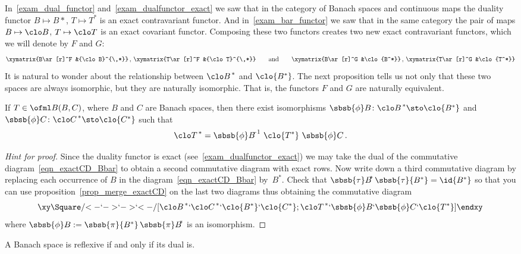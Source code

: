 In~\ref{exam_dual_functor} and~\ref{exam_dualfunctor_exact} we saw that in the category of Banach spaces
and continuous maps the duality functor $B \mapsto B*$, $T \mapsto T^*$ is an exact contravariant functor.
And in~\ref{exam_bar_functor} we saw that in the same category the pair of maps $B \mapsto \clo B$,
$T \mapsto \clo T$ is an exact covariant functor.  Composing these two functors creates two new exact 
contravariant functors, which we will denote by $F$ and $G$:
  \[ \xymatrix{B\ar[r]^F &{\clo B}^{\,*}}\,,\,\xymatrix{T\ar[r]^F &{\clo T}^{\,*}} \qquad \text{and} \qquad
           \xymatrix{B\ar[r]^G &\clo{B^*}}\,,\,\xymatrix{T\ar[r]^G &\clo{T^*}}  \]
It is natural to wonder about the relationship between ${\clo B}^{\,*}$ and $\clo{B^*}$.  The next proposition
tells us not only that these two spaces are always isomorphic, but they are naturally isomorphic.  That is, the
functors $F$ and $G$ are naturally equivalent.

\begin{prop} If $T \in \ofml B(B,C)$, where $B$ and $C$ are Banach spaces, then there exist isomorphisms 
$\sbsb{\phi}B \colon {\clo B}^{\,*} \sto \clo{B^*}$ and $\sbsb{\phi}C \colon {\clo C}^{\,*} \sto \clo{C^*}$ such that
   \[ {\clo T}^{\,*} = {\sbsb{\phi}B}^{\!\!\!-1}\,\, \clo{T^*}\,\,\sbsb{\phi}C\,. \]  
\end{prop}

\begin{proof}[\emph{Hint for proof}] Since the duality functor is exact (see~\ref{exam_dualfunctor_exact}) we may 
take the dual of the commutative diagram~\eqref{eqn_exactCD_Bbar} to obtain a second commutative diagram with exact
rows.  Now write down a third commutative diagram by replacing each occurrence of $B$ in the diagram~\eqref{eqn_exactCD_Bbar}
by~$B^*$.  Check that ${\sbsb{\tau}B}^{\!\!*}\,\sbsb{\tau}{B^*} = \id{B^*}$ so that you can use proposition~\ref{prop_merge_exactCD}
on the last two diagrams thus obtaining the commutative diagram
     \[ \xy
          \Square/{<-}`{->}`{->}`{<-}/[{\clo B}^{\,*}`{\clo C}^{\,*}`\clo{B^*}`\clo{C^*};{\clo T}^{\,*}`\sbsb{\phi}B`\sbsb{\phi}C`\clo{T^*}]
      \endxy \]
where $\sbsb{\phi}B := \sbsb{\pi}{B^*}\,{\sbsb{\pi}B}^{\!\!*}$ is an isomorphism.   \ns 
\end{proof}

\begin{cor} A Banach space is reflexive if and only if its dual is.  
\end{cor}

